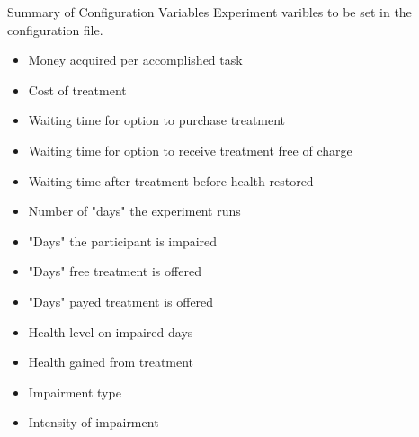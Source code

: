 \documentclass[22pt]{beamer}
\begin{document}
\begin{frame}[fragile]
\begin{textblock}{7.25}
\begin{block}{Summary of Configuration Variables}
Experiment varibles to be set in the configuration file.
\begin{itemize}
\item Money acquired per accomplished task
\item Cost of treatment
\item Waiting time for option to purchase treatment
\item Waiting time for option to receive treatment free of charge
\item Waiting time after treatment before health restored
\item Number of "days" the experiment runs
\item "Days" the participant is impaired
\item "Days" free treatment is offered
\item "Days" payed treatment is offered
\item Health level on impaired days
\item Health gained from treatment
\item Impairment type
\item Intensity of impairment
\end{itemize}





\end{block}
\end{textblock}
\end{frame}
\end{document}
